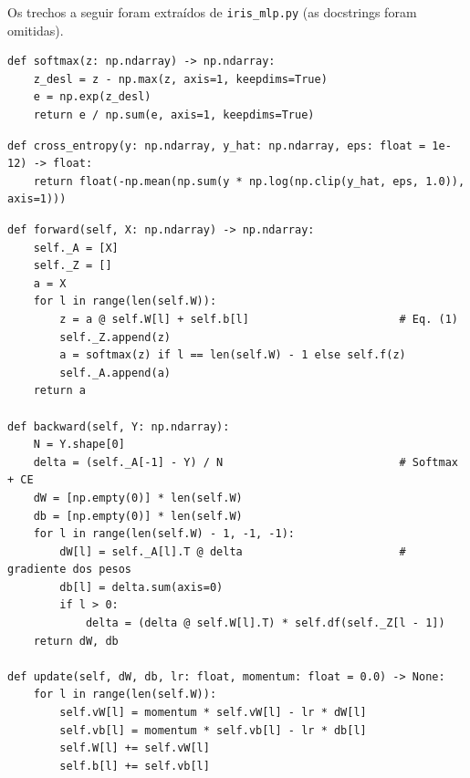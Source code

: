 \documentclass[12pt,a4paper]{article}
\begin{document}
Os trechos a seguir foram extraídos de \texttt{iris\_mlp.py} (as docstrings foram omitidas).

\begin{lstlisting}[caption={Softmax numericamente estável (Eq.~\ref{eq:softmax}).},label={lst:softmax}]
def softmax(z: np.ndarray) -> np.ndarray:
    z_desl = z - np.max(z, axis=1, keepdims=True)
    e = np.exp(z_desl)
    return e / np.sum(e, axis=1, keepdims=True)
\end{lstlisting}

\begin{lstlisting}[caption={Entropia cruzada categorial (Eq.~\ref{eq:ce}).},label={lst:ce}]
def cross_entropy(y: np.ndarray, y_hat: np.ndarray, eps: float = 1e-12) -> float:
    return float(-np.mean(np.sum(y * np.log(np.clip(y_hat, eps, 1.0)), axis=1)))
\end{lstlisting}

\begin{lstlisting}[caption={Propagação direta, retropropagação e atualização com momentum (métodos da classe \texttt{MLP}).},label={lst:backprop}]
def forward(self, X: np.ndarray) -> np.ndarray:
    self._A = [X]
    self._Z = []
    a = X
    for l in range(len(self.W)):
        z = a @ self.W[l] + self.b[l]                       # Eq. (1)
        self._Z.append(z)
        a = softmax(z) if l == len(self.W) - 1 else self.f(z)
        self._A.append(a)
    return a

def backward(self, Y: np.ndarray):
    N = Y.shape[0]
    delta = (self._A[-1] - Y) / N                           # Softmax + CE
    dW = [np.empty(0)] * len(self.W)
    db = [np.empty(0)] * len(self.W)
    for l in range(len(self.W) - 1, -1, -1):
        dW[l] = self._A[l].T @ delta                        # gradiente dos pesos
        db[l] = delta.sum(axis=0)
        if l > 0:
            delta = (delta @ self.W[l].T) * self.df(self._Z[l - 1])
    return dW, db

def update(self, dW, db, lr: float, momentum: float = 0.0) -> None:
    for l in range(len(self.W)):
        self.vW[l] = momentum * self.vW[l] - lr * dW[l]
        self.vb[l] = momentum * self.vb[l] - lr * db[l]
        self.W[l] += self.vW[l]
        self.b[l] += self.vb[l]
\end{lstlisting}
\end{document}
